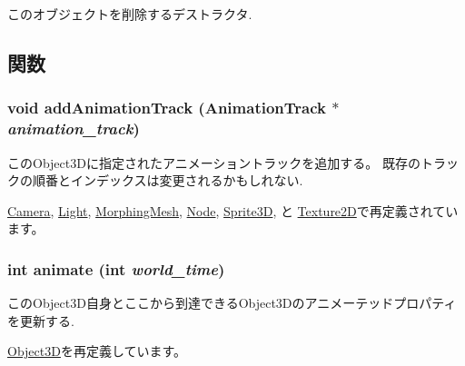 このオブジェクトを削除するデストラクタ. 

\subsection{関数}
\hypertarget{classm3g_1_1Transformable_415c0b110f95410ded9b85e5d99a496b}{
\subsubsection[{addAnimationTrack}]{\setlength{\rightskip}{0pt plus 5cm}void addAnimationTrack ({\bf AnimationTrack} $\ast$ {\em animation\_\-track})}}
\label{classm3g_1_1Transformable_415c0b110f95410ded9b85e5d99a496b}


このObject3Dに指定されたアニメーショントラックを追加する。 既存のトラックの順番とインデックスは変更されるかもしれない. 

\hyperlink{classm3g_1_1Camera_415c0b110f95410ded9b85e5d99a496b}{Camera}, \hyperlink{classm3g_1_1Light_415c0b110f95410ded9b85e5d99a496b}{Light}, \hyperlink{classm3g_1_1MorphingMesh_415c0b110f95410ded9b85e5d99a496b}{MorphingMesh}, \hyperlink{classm3g_1_1Node_415c0b110f95410ded9b85e5d99a496b}{Node}, \hyperlink{classm3g_1_1Sprite3D_415c0b110f95410ded9b85e5d99a496b}{Sprite3D}, と \hyperlink{classm3g_1_1Texture2D_415c0b110f95410ded9b85e5d99a496b}{Texture2D}で再定義されています。\hypertarget{classm3g_1_1Transformable_8aad1ceab4c2a03609c8a42324ce484d}{
\subsubsection[{animate}]{\setlength{\rightskip}{0pt plus 5cm}int animate (int {\em world\_\-time})}}
\label{classm3g_1_1Transformable_8aad1ceab4c2a03609c8a42324ce484d}


このObject3D自身とここから到達できるObject3Dのアニメーテッドプロパティを更新する. 

\hyperlink{classm3g_1_1Object3D_8aad1ceab4c2a03609c8a42324ce484d}{Object3D}を再定義しています。

